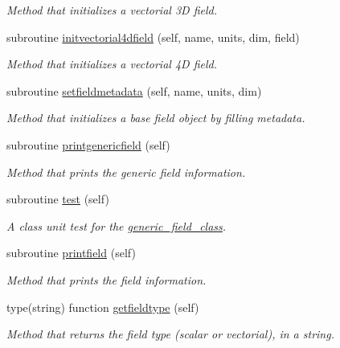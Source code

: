 \begin{DoxyCompactItemize}
\begin{DoxyCompactList}\small\item\em Method that initializes a vectorial 3D field. \end{DoxyCompactList}\item 
subroutine \mbox{\hyperlink{namespacefieldtypes__mod_ad458710e4a2d6c40a3dfa7f19481cd5a}{initvectorial4dfield}} (self, name, units, dim, field)
\begin{DoxyCompactList}\small\item\em Method that initializes a vectorial 4D field. \end{DoxyCompactList}\item 
subroutine \mbox{\hyperlink{namespacefieldtypes__mod_abc601ce9f8a974f426e876cc4c02e2a2}{setfieldmetadata}} (self, name, units, dim)
\begin{DoxyCompactList}\small\item\em Method that initializes a base field object by filling metadata. \end{DoxyCompactList}\item 
subroutine \mbox{\hyperlink{namespacefieldtypes__mod_a63d399d72fffde3fe8169b76cce59259}{printgenericfield}} (self)
\begin{DoxyCompactList}\small\item\em Method that prints the generic field information. \end{DoxyCompactList}\item 
subroutine \mbox{\hyperlink{namespacefieldtypes__mod_a0babd6327ed77199d5437d17de34bafe}{test}} (self)
\begin{DoxyCompactList}\small\item\em A class \textquotesingle{}unit\textquotesingle{} test for the \mbox{\hyperlink{structfieldtypes__mod_1_1generic__field__class}{generic\+\_\+field\+\_\+class}}. \end{DoxyCompactList}\item 
subroutine \mbox{\hyperlink{namespacefieldtypes__mod_a5a556fba603c1d39b20713fdbc813332}{printfield}} (self)
\begin{DoxyCompactList}\small\item\em Method that prints the field information. \end{DoxyCompactList}\item 
type(string) function \mbox{\hyperlink{namespacefieldtypes__mod_a5faf9c157541acaa9681be2d59eda850}{getfieldtype}} (self)
\begin{DoxyCompactList}\small\item\em Method that returns the field type (scalar or vectorial), in a string. \end{DoxyCompactList}\item 

\end{DoxyCompactItemize}
